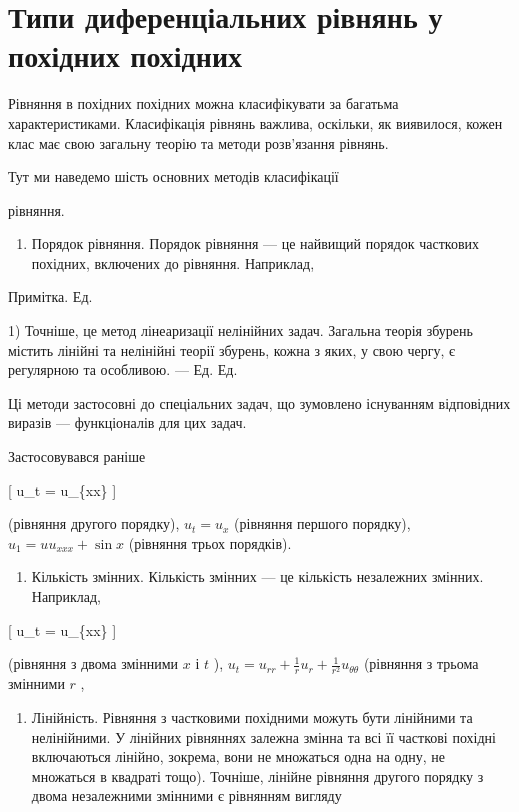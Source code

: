 \documentclass[
  ukrainian,
]{article}
\providecommand{\tightlist}{%
  \setlength{\itemsep}{0pt}\setlength{\parskip}{0pt}}
\begin{document}
\section{Типи диференціальних рівнянь у похідних
похідних}\label{ux442ux438ux43fux438-ux434ux438ux444ux435ux440ux435ux43dux446ux456ux430ux43bux44cux43dux438ux445-ux440ux456ux432ux43dux44fux43dux44c-ux443-ux43fux43eux445ux456ux434ux43dux438ux445-ux43fux43eux445ux456ux434ux43dux438ux445}

Рівняння в похідних похідних можна класифікувати за багатьма
характеристиками. Класифікація рівнянь важлива, оскільки, як виявилося,
кожен клас має свою загальну теорію та методи розв'язання рівнянь.

Тут ми наведемо шість основних методів класифікації

рівняння.

\begin{enumerate}
\def\labelenumi{\arabic{enumi}.}
\tightlist
\item
  Порядок рівняння. Порядок рівняння --- це найвищий порядок часткових
  похідних, включених до рівняння. Наприклад,
\end{enumerate}

Примітка. Ед.

1) Точніше, це метод лінеаризації нелінійних задач. Загальна теорія
збурень містить лінійні та нелінійні теорії збурень, кожна з яких, у
свою чергу, є регулярною та особливою. --- Ед. Ед.

Ці методи застосовні до спеціальних задач, що зумовлено існуванням
відповідних виразів --- функціоналів для цих задач.

Застосовувався раніше

{[} u\_t = u\_\{xx\} {]}

(рівняння другого порядку), \(u_t = u_x\) (рівняння першого порядку),
\(u_1 = uu_{xxx} + \sin x\) (рівняння трьох порядків).

\begin{enumerate}
\def\labelenumi{\arabic{enumi}.}
\setcounter{enumi}{1}
\tightlist
\item
  Кількість змінних. Кількість змінних --- це кількість незалежних
  змінних. Наприклад,
\end{enumerate}

{[} u\_t = u\_\{xx\} {]}

(рівняння з двома змінними \(x\) і \(t\) ),
\(u_t = u_{rr} + \frac{1}{r} u_r + \frac{1}{r^2} u_{\theta\theta}\)
(рівняння з трьома змінними \(r\) ,

\begin{enumerate}
\def\labelenumi{\arabic{enumi}.}
\setcounter{enumi}{2}
\tightlist
\item
  Лінійність. Рівняння з частковими похідними можуть бути лінійними та
  нелінійними. У лінійних рівняннях залежна змінна та всі її часткові
  похідні включаються лінійно, зокрема, вони не множаться одна на одну,
  не множаться в квадраті тощо). Точніше, лінійне рівняння другого
  порядку з двома незалежними змінними є рівнянням вигляду
\end{enumerate}
\end{document}

